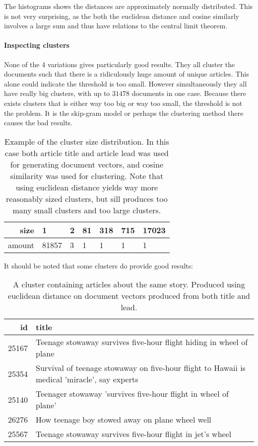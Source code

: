 The histograms shows the distances are approximately normally distributed. This is not very surprising, as the both the euclidean distance and cosine similarly involves a large sum and thus have relations to the central limit theorem.

\paragraph{Inspecting clusters}  None of the 4 variations gives particularly good results. They all cluster the documents such that there is a ridiculously huge amount of unique articles. This alone could indicate the threshold is too small. However simultaneously they all have really big clusters, with up to $31478$ documents in one case. Because there exists clusters that is either way too big or way too small, the threshold is not the problem. It is the skip-gram model or perhaps the clustering method there causes the bad results.

\begin{table}[H]
\centering
\begin{tabular}{r|l l l l l l }
size & 1 & 2 & 81 & 318 & 715 & 17023 \\ \hline
amount & 81857 & 3 & 1 & 1 & 1 & 1
\end{tabular}
\caption{Example of the cluster size distribution. In this case both article title and article lead was used for generating document vectors, and cosine similarity was used for clustering. Note that using euclidean distance yields way more reasonably sized clusters, but sill produces too many small clusters and too large clusters.}
\end{table}

It should be noted that some clusters do provide good results:

\begin{table}[H]
\centering
\begin{tabular}{r|p{10cm}}
id & title \\ \hline
 25167 & Teenage stowaway survives five-hour flight hiding in wheel of plane \\
 25354 & Survival of teenage stowaway on five-hour flight to Hawaii is medical 'miracle', say experts \\
 25140 & Teenager stowaway 'survives five-hour flight in wheel of plane' \\
 26276 & How teenage boy stowed away on plane wheel well \\
 25567 & Teenage stowaway survives five-hour flight in jet's wheel
\end{tabular}
\caption{A cluster containing articles about the same story. Produced using euclidean distance on document vectors produced from both title and lead.}
\end{table}
 
